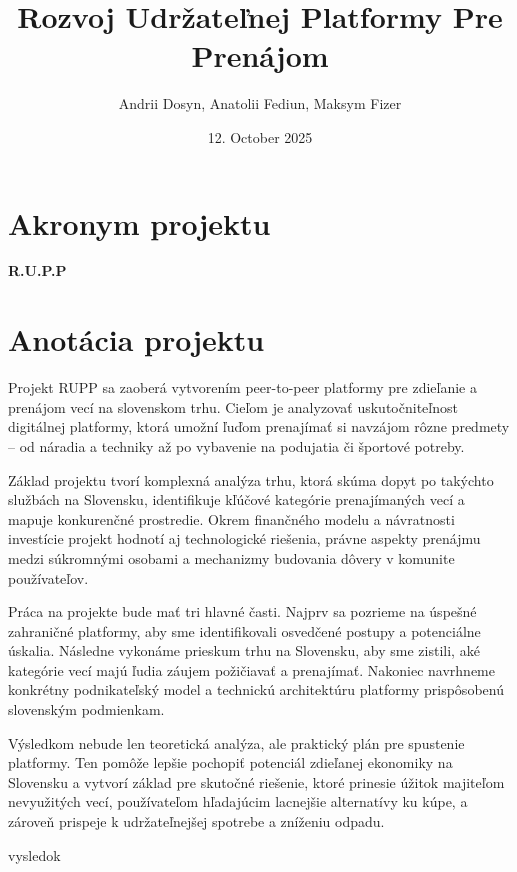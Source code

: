 \documentclass[12pt,twoside,slovak,a4paper]{article}
\title{\textbf{Rozvoj Udržateľnej Platformy Pre Prenájom}} %
\author{Andrii Dosyn, Anatolii Fediun, Maksym Fizer}
\date{\small 12. October 2025} %
\begin{document}
\maketitle

\section*{Akronym projektu}
\textbf{R.U.P.P }


\section*{Anotácia projektu}

Projekt RUPP sa zaoberá vytvorením peer-to-peer platformy pre zdieľanie a prenájom vecí na slovenskom trhu. Cieľom je analyzovať uskutočniteľnost digitálnej platformy, ktorá umožní ľuďom prenajímať si navzájom rôzne predmety – od náradia a techniky až po vybavenie na podujatia či športové potreby. 

Základ projektu tvorí komplexná analýza trhu, ktorá skúma dopyt po takýchto službách na Slovensku, identifikuje kľúčové kategórie prenajímaných vecí a mapuje konkurenčné prostredie. Okrem finančného modelu a návratnosti investície projekt hodnotí aj technologické riešenia, právne aspekty prenájmu medzi súkromnými osobami a mechanizmy budovania dôvery v komunite používateľov.

Práca na projekte bude mať tri hlavné časti. Najprv sa pozrieme na úspešné zahraničné platformy, aby sme identifikovali osvedčené postupy a potenciálne úskalia. Následne vykonáme prieskum trhu na Slovensku, aby sme zistili, aké kategórie vecí majú ľudia záujem požičiavať a prenajímať. Nakoniec navrhneme konkrétny podnikateľský model a technickú architektúru platformy prispôsobenú slovenským podmienkam. 

Výsledkom nebude len teoretická analýza, ale praktický plán pre spustenie platformy. Ten pomôže lepšie pochopiť potenciál zdieľanej ekonomiky na Slovensku a vytvorí základ pre skutočné riešenie, ktoré prinesie úžitok majiteľom nevyužitých vecí, používateľom hľadajúcim lacnejšie alternatívy ku kúpe, a zároveň prispeje k udržateľnejšej spotrebe a zníženiu odpadu.

vysledok
\end{document}

